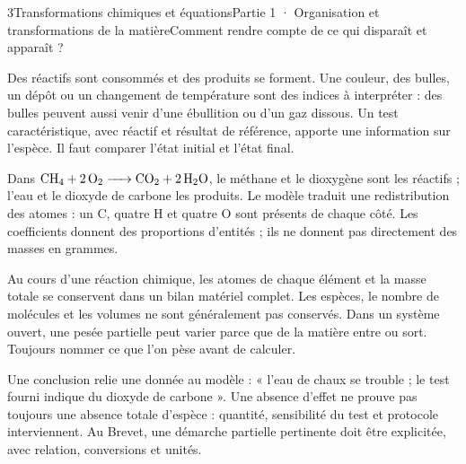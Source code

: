 \begin{ouverture}[college1]{3}{Transformations chimiques et équations}{Partie 1 · Organisation et transformations de la matière}{Comment rendre compte de ce qui disparaît et apparaît ?}
\end{ouverture}
\label{ess-3}
Des réactifs sont consommés et des produits se forment. Une couleur, des bulles, un dépôt ou un changement de température sont des indices à interpréter : des bulles peuvent aussi venir d’une ébullition ou d’un gaz dissous. Un test caractéristique, avec réactif et résultat de référence, apporte une information sur l’espèce. Il faut comparer l’état initial et l’état final.\par
{}
Dans $\ce{CH4 + 2 O2 -> CO2 + 2 H2O}$, le méthane et le dioxygène sont les réactifs ; l’eau et le dioxyde de carbone les produits. Le modèle traduit une redistribution des atomes : un C, quatre H et quatre O sont présents de chaque côté. Les coefficients donnent des proportions d’entités ; ils ne donnent pas directement des masses en grammes.\par
\clearpage
{}
Au cours d’une réaction chimique, les atomes de chaque élément et la masse totale se conservent dans un bilan matériel complet. Les espèces, le nombre de molécules et les volumes ne sont généralement pas conservés. Dans un système ouvert, une pesée partielle peut varier parce que de la matière entre ou sort. Toujours nommer ce que l’on pèse avant de calculer.\par
{}
Une conclusion relie une donnée au modèle : « l’eau de chaux se trouble ; le test fourni indique du dioxyde de carbone ». Une absence d’effet ne prouve pas toujours une absence totale d’espèce : quantité, sensibilité du test et protocole interviennent. Au Brevet, une démarche partielle pertinente doit être explicitée, avec relation, conversions et unités.\par
